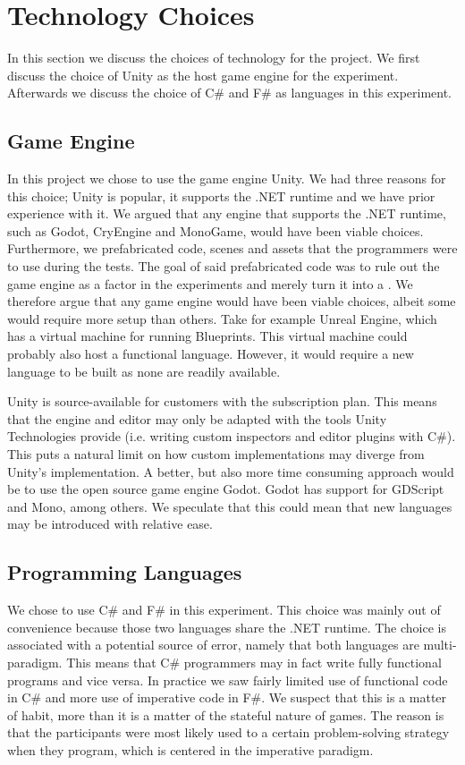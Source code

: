 \section{Technology Choices}
In this section we discuss the choices of technology for the project. We first discuss the choice of Unity as the host game engine for the experiment. Afterwards we discuss the choice of C\# and F\# as languages in this experiment.

\subsection{Game Engine}
In this project we chose to use the game engine Unity. We had three reasons for this choice; Unity is popular, it supports the .NET runtime and we have prior experience with it. We argued that any engine that supports the .NET runtime, such as Godot, CryEngine and MonoGame, would have been viable choices. Furthermore, we prefabricated code, scenes and assets that the programmers were to use during the tests. The goal of said prefabricated code was to rule out the game engine as a factor in the experiments and merely turn it into a .
We therefore argue that any game engine would have been viable choices, albeit some would require more setup than others. Take for example Unreal Engine, which has a virtual machine for running Blueprints\cite{unreal2019blueprintNativiziation}. This virtual machine could probably also host a functional language. However, it would require a new language to be built as none are readily available.

Unity is source-available for customers with the  subscription plan. This means that the engine and editor may only be adapted with the tools Unity Technologies provide (i.e. writing custom inspectors and editor plugins with C\#). This puts a natural limit on how  custom implementations may diverge from Unity's implementation. A better, but also more time consuming approach would be to use the open source game engine Godot. Godot has support for GDScript and Mono, among others. We speculate that this could mean that new languages may be introduced with relative ease.

\subsection{Programming Languages}
We chose to use C\# and F\# in this experiment. This choice was mainly out of convenience because those two languages share the .NET runtime. The choice is associated with a potential source of error, namely that both languages are multi-paradigm. This means that C\# programmers may in fact write fully functional programs and vice versa. In practice we saw fairly limited use of functional code in C\# and more use of imperative code in F\#. We suspect that this is a matter of habit, more than it is a matter of the stateful nature of games. The reason is that the participants were most likely used to a certain problem-solving strategy when they program, which is centered in the imperative paradigm. 

